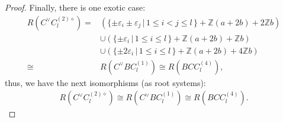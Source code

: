 \documentclass[11pt]{amsart}
\newcommand{\Z}{\mathbb{Z}}
\newcommand{\vep}{\varepsilon}
\begin{document}
\begin{proof}
Finally, there is one exotic case:
 \begin{align*}
 R(C^\vee C_l^{(2)\diamond})=
 &\left(\{ \pm \vep_i  \pm \vep_j\, \vert\, 1\leq i<j\leq l\, \}+\Z(a+2b)+ 2\Z b\right) \\
 & \cup \left( \{ \pm \vep_i\, \vert\, 1\leq i\leq l\, \}+\Z(a+2b)+ \Z b\right) \\
 & \cup \left( \{ \pm 2\vep_i\, \vert\, 1\leq i\leq l\, \}+\Z(a+2b)+4\Z b\right) \\
 \cong 
& R(C^\vee BC_l^{(1)}) \cong R(BCC_l^{(4)}),
 \end{align*}
thus, we have the next isomorphisms (as root systems):
\begin{align*}
R(C^\vee C_l^{(2)\diamond}) \cong R(C^\vee BC_l^{(1)}) \cong R(BCC_l^{(4)}).
\end{align*}
\end{proof}
\end{document}
